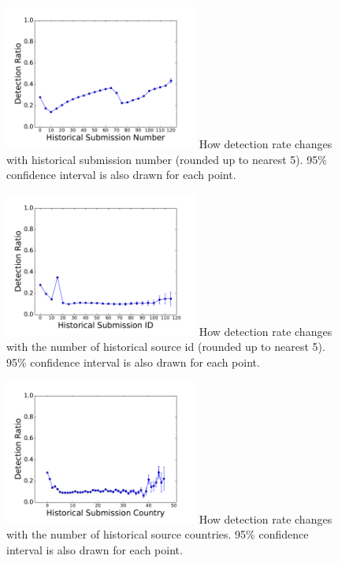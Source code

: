 

\begin{figure}[t!]
\begin{center}
\includegraphics[width=2.5in]{figure/SubNum}
{
How detection rate changes with historical submission number (rounded up to nearest 5).
95\% confidence interval is also drawn for each point.   
}
\end{center}
\end{figure}

\begin{figure}[t!]
\begin{center}
\includegraphics[width=2.5in]{figure/SubID}
{
How detection rate changes with the number of historical source id (rounded up to nearest 5).
95\% confidence interval is also drawn for each point.   
}
\end{center}
\end{figure}

\begin{figure}[t!]
\begin{center}
\includegraphics[width=2.5in]{figure/SubCountry}
{
How detection rate changes with the number of historical source countries.
95\% confidence interval is also drawn for each point.   
}
\end{center}
\end{figure}

